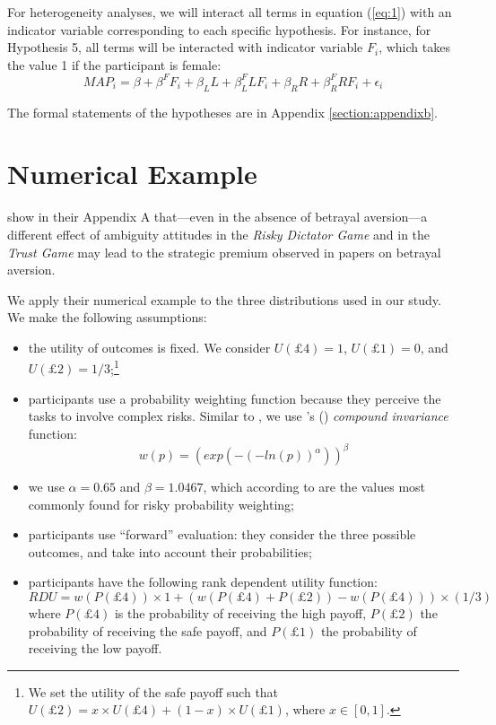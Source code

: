 For heterogeneity analyses, we will interact all terms in equation (\ref{eq:1}) with an indicator variable corresponding to each specific hypothesis.
For instance, for Hypothesis 5, all terms will be interacted with indicator variable $F_i$, which takes the value 1 if the participant is female:
\begin{equation} \label{eq:2}
MAP_i = \beta + \beta^F F_i + \beta_L L + \beta_L^F L F_i + \beta_R R + \beta_R^F R F_i + \epsilon_i
\end{equation}

The formal statements of the hypotheses are in Appendix \ref{section:appendixb}.

\clearpage
\pagebreak



\clearpage
\pagebreak

\appendix
\section{Numerical Example}
\label{section:appendixa}
\setcounter{figure}{0}
\setcounter{table}{0}
\renewcommand{\thefigure}{A.\arabic{figure}}
\renewcommand{\thetable}{A.\arabic{table}}

\cite{Li2020a} show in their Appendix A that---even in the absence of betrayal aversion---a different effect of ambiguity attitudes in the \textit{Risky Dictator Game} and in the \textit{Trust Game} may lead to the strategic premium observed in papers on betrayal aversion.

We apply their numerical example to the three distributions used in our study.
We make the following assumptions:
\begin{itemize}
\item the utility of outcomes is fixed. We consider $U(\pounds4) = 1$, $U(\pounds1) = 0$, and $U(\pounds2) = 1/3$;\footnote{
We set the utility of the safe payoff such that $U(\pounds2) = x \times U(\pounds4) + (1-x) \times U(\pounds1)$, where $x \in [0,1]$.
}
\item participants use a probability weighting function because they perceive the tasks to involve complex risks. Similar to \cite{Li2020a}, we use \citeauthor{Prelec1998}'s (\citeyear{Prelec1998}) \textit{compound invariance} function:
$$w(p) = (exp(-(-ln(p))^\alpha))^\beta$$ 
\item we use $\alpha = 0.65$ and $\beta = 1.0467$, which according to \cite{Li2020a} are the values most commonly found for risky probability weighting;
\item participants use ``forward'' evaluation: they consider the three possible outcomes, and take into account their probabilities;
\item participants have the following rank dependent utility function:
$$RDU = w(P(\pounds4)) \times 1 + (w(P(\pounds4) + P(\pounds2)) - w(P(\pounds4))) \times (1/3)$$
where $P(\pounds4)$ is the probability of receiving the high payoff, $P(\pounds2)$ the probability of receiving the safe payoff, and $P(\pounds1)$ the probability of receiving the low payoff.
\end{itemize}

